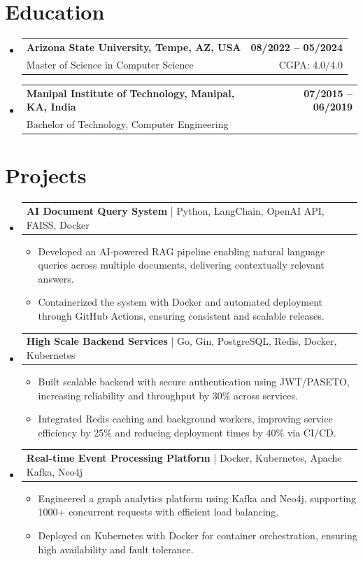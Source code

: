 \documentclass[letterpaper,11pt]{article}
\makeatletter
\newcommand{\resumeItem}[1]{
  \item\footnotesize{
    {#1 \vspace{-2pt}}
  }
}
\newcommand{\educationSubheading}[4]{
  \vspace{-2pt}\item
    \begin{tabular*}{1.0\textwidth}[t]{l@{\extracolsep{\fill}}r}
      \textbf{\small #1} & \textbf{\small #2} \\
      {\small#3} & {\small #4} \\
    \end{tabular*}\vspace{-7pt}
}
\newcommand{\resumeProjectHeading}[2]{
    \item
    \begin{tabular*}{1.001\textwidth}{l@{\extracolsep{\fill}}r}
      \small#1 & \textbf{\small #2}\\
    \end{tabular*}\vspace{-7pt}
}
\newcommand{\resumeSubHeadingListStart}{\begin{itemize}[leftmargin=0pt, label={}]}
\newcommand{\resumeSubHeadingListEnd}{\end{itemize}}
\newcommand{\resumeItemListStart}{\begin{itemize}[leftmargin=*]}
\newcommand{\resumeItemListEnd}{\end{itemize}\vspace{-5pt}}
\makeatother
\begin{document}
\section{Education}
  \resumeSubHeadingListStart
    \educationSubheading
      {Arizona State University, Tempe, AZ, USA}{08/2022 -- 05/2024}
      {Master of Science in Computer Science}{CGPA: 4.0/4.0}
    \educationSubheading
      {Manipal Institute of Technology, Manipal, KA, India}{07/2015 -- 06/2019}
      {Bachelor of Technology, Computer Engineering}{}
  \resumeSubHeadingListEnd

\section{Projects}
    \vspace{-5pt}
    \resumeSubHeadingListStart

      \resumeProjectHeading
          {\textbf{AI Document Query System} | Python, LangChain, OpenAI API, FAISS, Docker}{}
        \resumeItemListStart
            \resumeItem{Developed an AI-powered RAG pipeline enabling natural language queries across multiple documents, delivering contextually relevant answers.}
            \resumeItem{Containerized the system with Docker and automated deployment through GitHub Actions, ensuring consistent and scalable releases.}
        \resumeItemListEnd
        \vspace{-12pt}

      \resumeProjectHeading
          {\textbf{High Scale Backend Services} | Go, Gin, PostgreSQL, Redis, Docker, Kubernetes}{}
        \resumeItemListStart
            \resumeItem{Built scalable backend with secure authentication using JWT/PASETO, increasing reliability and throughput by 30\% across services.}
            \resumeItem{Integrated Redis caching and background workers, improving service efficiency by 25\% and reducing deployment times by 40\% via CI/CD.}
        \resumeItemListEnd
        \vspace{-12pt}

      \resumeProjectHeading
          {\textbf{Real-time Event Processing Platform} | Docker, Kubernetes, Apache Kafka, Neo4j}{}
        \resumeItemListStart
            \resumeItem{Engineered a graph analytics platform using Kafka and Neo4j, supporting 1000+ concurrent requests with efficient load balancing.}
            \resumeItem{Deployed on Kubernetes with Docker for container orchestration, ensuring high availability and fault tolerance.}
        \resumeItemListEnd

    \resumeSubHeadingListEnd
\end{document}
